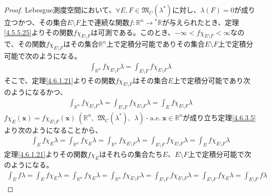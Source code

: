 \documentclass[dvipdfmx]{jsarticle}
\begin{document}
\begin{proof}
Lebesgue測度空間において、$\forall E,F \in \mathfrak{M}_{C}\left( \lambda^{*} \right)$に対し、$\lambda(F) = 0$が成り立つかつ、その集合$E \setminus F$上で連続な関数$f:\mathbb{R}^{n} \rightarrow{}^{*}\mathbb{R}$が与えられたとき、定理\ref{4.5.5.25}よりその関数$f\chi_{E \setminus F}$は可測である。このとき、$- \infty < f\chi_{E \setminus F} < \infty$なので、その関数$f\chi_{E \setminus F}$はその集合$\mathbb{R}^{n}$上で定積分可能でありその集合$E \setminus F$上で定積分可能で次のようになる。
\begin{align*}
\int_{\mathbb{R}^{n}} {f\chi_{E \setminus F}\lambda} = \int_{E \setminus F} {f\chi_{E \setminus F}\lambda}
\end{align*}
そこで、定理\ref{4.6.1.21}よりその関数$f\chi_{E \setminus F}$はその集合$E$上で定積分可能であり次のようになるかつ、
\begin{align*}
\int_{\mathbb{R}^{n}} {f\chi_{E \setminus F}\lambda} = \int_{E \setminus F} {f\chi_{E \setminus F}\lambda} = \int_{E} {f\chi_{E \setminus F}\lambda}
\end{align*}
$f\chi_{E}\left( \mathbf{x} \right) = f\chi_{E \setminus F}\left( \mathbf{x} \right)\ \left( \mathbb{R}^{n},\ \ \mathfrak{M}_{C}\left( \lambda^{*} \right),\ \ \lambda \right) \ \text{-} \ \mathrm{a.e.}\ \mathbf{x} \in \mathbb{R}^{n}$が成り立ち定理\ref{4.6.3.5}より次のようになることから、
\begin{align*}
\int_{E} {f\chi_{E}\lambda} = \int_{\mathbb{R}^{n}} {f\chi_{E}\lambda} = \int_{\mathbb{R}^{n}} {f\chi_{E \setminus F}\lambda} = \int_{E \setminus F} {f\chi_{E \setminus F}\lambda} = \int_{E} {f\chi_{E \setminus F}\lambda}
\end{align*}
定理\ref{4.6.1.21}よりその関数$f\chi_{E}$はそれらの集合たち$E$、$E \setminus F$上で定積分可能で次のようになる。
\begin{align*}
\int_{E} {f\lambda} = \int_{E} {f\chi_{E}\lambda} = \int_{\mathbb{R}^{n}} {f\chi_{E}\lambda} = \int_{\mathbb{R}^{n}} {f\chi_{E \setminus F}\lambda} = \int_{E \setminus F} {f\chi_{E \setminus F}\lambda} = \int_{E \setminus F} {f\chi_{E}\lambda} = \int_{E \setminus F} {f\lambda}
\end{align*}
\end{proof}
\end{document}
